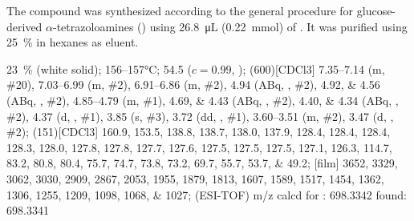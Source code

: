 The compound was synthesized according to the general procedure for glucose-derived $\alpha$-tetrazoloamines () using \SI{26.8}{\micro\liter} (\SI{0.22}{\milli\mol}) of .
It was purified using \SI{25}{\percent}  in hexanes as eluent.
\begin{fullexp}
	 \SI{23}{\percent} (white solid); 
	 \numrange{156}{157}\si{\celsius}; 
	\data{[$\alpha^{23}_D$]~$=$} \num{54.5} ($c = 0.99$, ); 
	\NMR(600)[CDCl3] \numrange{7.35}{7.14} (m, \#{20}), \numrange{7.03}{6.99} (m, \#{2}), \numrange{6.91}{6.86} (m, \#{2}), \num{4.94} (ABq, , \#{2}), \numlist{4.92;4.56} (ABq, , \#{2}), \numrange{4.85}{4.79} (m, \#{1}), \numlist{4.69;4.43} (ABq, , \#{2}), \numlist{4.40;4.34} (ABq, , \#{2}), \num{4.37} (d, , \#{1}), \num{3.85} (s, \#{3}), \num{3.72} (dd, , \#{1}), \numrange{3.60}{3.51} (m, \#{2}), \num{3.47} (d, , \#{2}); 
	(151)[CDCl3] \numlist{160.9; 153.5; 138.8; 138.7; 138.0; 137.9; 128.4; 128.4; 128.4; 128.3; 128.0; 127.8; 127.8; 127.7; 127.6; 127.5; 127.5; 127.5; 127.1; 126.3; 114.7; 83.2; 80.8; 80.4; 75.7; 74.7; 73.8; 73.2; 69.7; 55.7; 53.7; 49.2}; 
	[film] \numlist{3652; 3329; 3062; 3030; 2909; 2867; 2053; 1955; 1879; 1813; 1607; 1589; 1517; 1454; 1362; 1306; 1255; 1209; 1098; 1068; 1027}; 
	 (ESI-TOF) m/z calcd for : \num{698.3342} found: \num{698.3341}
\end{fullexp}

